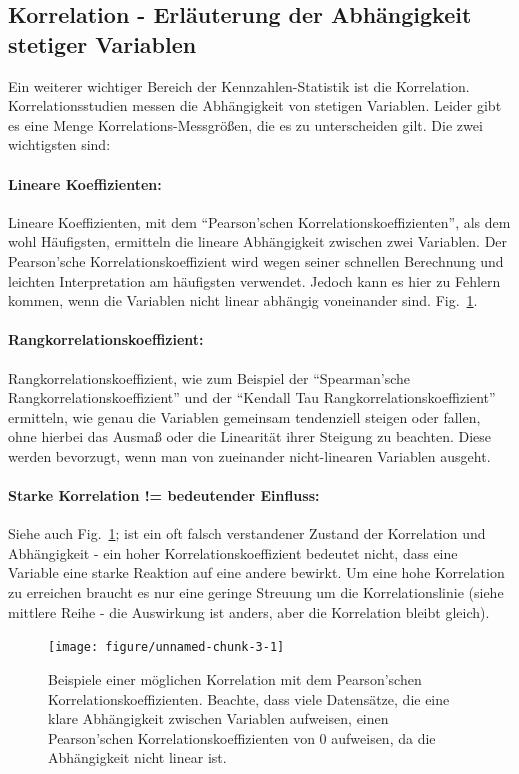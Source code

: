 \documentclass[a4paper,twoside]{tufte-book}\usepackage[]{graphicx}\usepackage[]{color}
\begin{document}
\subsection{Korrelation - Erläuterung der Abhängigkeit stetiger Variablen}

Ein weiterer wichtiger Bereich der Kennzahlen-Statistik ist die Korrelation. Korrelationsstudien messen die Abhängigkeit von stetigen Variablen. Leider gibt es eine Menge Korrelations-Messgrößen, die es zu unterscheiden gilt. Die zwei wichtigsten sind:

\paragraph{Lineare Koeffizienten:}Lineare Koeffizienten, mit dem "`Pearson'schen Korrelationskoeffizienten"', als dem wohl Häufigsten, ermitteln die lineare Abhängigkeit zwischen zwei Variablen. Der Pearson'sche Korrelationskoeffizient wird wegen seiner schnellen Berechnung und leichten Interpretation am häufigsten verwendet. Jedoch kann es hier zu Fehlern kommen, wenn die Variablen nicht linear abhängig voneinander sind. Fig.~\ref{fig: correlation}.

\paragraph{Rangkorrelationskoeffizient:} Rangkorrelationskoeffizient, wie zum Beispiel der "`Spearman'sche Rangkorrelationskoeffizient"' und der "`Kendall Tau Rangkorrelationskoeffizient"' ermitteln, wie genau die Variablen gemeinsam tendenziell steigen oder fallen, ohne hierbei das Ausmaß oder die Linearität ihrer Steigung zu beachten. Diese werden bevorzugt, wenn man von zueinander nicht-linearen Variablen ausgeht. 

\paragraph{Starke Korrelation != bedeutender Einfluss:} Siehe auch Fig.~\ref{fig: correlation}; ist ein oft falsch verstandener Zustand der Korrelation und Abhängigkeit - ein hoher Korrelationskoeffizient bedeutet nicht, dass eine Variable eine starke Reaktion auf eine andere bewirkt. Um eine hohe Korrelation zu erreichen braucht es nur eine geringe Streuung um die Korrelationslinie (siehe mittlere Reihe - die Auswirkung ist anders, aber die Korrelation bleibt gleich). 


\begin{figure}[htbp]
\begin{center}
\begin{Schunk}

\texttt{[image: figure/unnamed-chunk-3-1]} \end{Schunk}
\caption{Beispiele einer möglichen Korrelation mit dem Pearson'schen Korrelationskoeffizienten. Beachte, dass viele Datensätze, die eine klare Abhängigkeit zwischen Variablen aufweisen, einen Pearson'schen Korrelationskoeffizienten von 0 aufweisen, da die Abhängigkeit nicht linear ist.}
\label{fig: correlation}
\end{center}
\end{figure}
\end{document}
